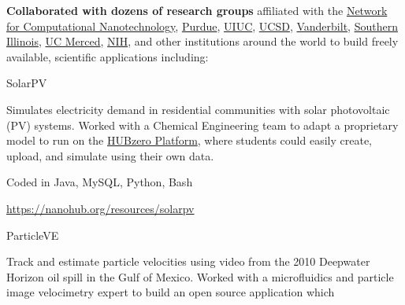 \documentclass[10pt]{article}
\newcommand\HUBZEROPLATFORM{\href{https://hubzero.org}{HUBzero Platform}}
\begin{document}
\begin{innerlist}
            \item \textbf{Collaborated with dozens of research groups} affiliated with the
                \href{https://nanohub.org/groups/ncn}{Network for Computational Nanotechnology},
                \href{https://engineering.purdue.edu/ChE/People/ptProfile?id=12436}{Purdue},
                \href{http://nanobionode.illinois.edu}{UIUC},
                \href{http://pegasus.isi.edu}{UCSD},
                \href{http://telab.vuse.vanderbilt.edu/greg.walker}{Vanderbilt},
                \href{http://www.engr.siu.edu/staff1/ahmed/mywebpage/ahmed.html}{Southern Illinois},
                \href{http://faculty1.ucmerced.edu/amartini}{UC Merced},
                \href{http://cbiit.nci.nih.gov/ncip}{NIH},
                and other institutions around the world to build freely available,
                scientific applications including:
                \begin{outerlist}
                    \item[] SolarPV
                        \begin{innerlist}
                            \item[] Simulates electricity demand in residential
                              communities with solar photovoltaic (PV) systems.
                              Worked with a Chemical Engineering team to adapt
                              a proprietary model to run on the \HUBZEROPLATFORM,
                              where students could easily create,
                              upload, and simulate using their own data.
                            \item[] Coded in Java, MySQL, Python, Bash
                            \item[] \url{https://nanohub.org/resources/solarpv} \hfill{}
                        \end{innerlist}
                    \item[] ParticleVE
                        \begin{innerlist}
                            \item[] Track and estimate particle velocities
                              using video from the 2010 Deepwater Horizon
                              oil spill in the Gulf of Mexico. Worked with
                              a microfluidics and particle image velocimetry
                              expert to build an open source application which

\end{innerlist}
\end{outerlist}
\end{innerlist}
\end{document}
